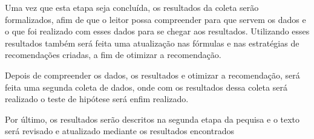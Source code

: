 Uma vez que esta etapa seja concluída, os resultados da coleta serão formalizados, afim de que o leitor
possa compreender para que servem os dados e o que foi realizado com esses
dados para se chegar aos resultados. Utilizando esses resultados também
será feita uma atualização nas fórmulas e nas estratégias de recomendações
criadas, a fim de otimizar a recomendação.

Depois de compreender os dados, os resultados e otimizar a recomendação,
será feita uma segunda coleta de dados, onde com os resultados dessa coleta
será realizado o teste de hipótese será enfim realizado.

Por último, os resultados serão descritos na segunda etapa da pequisa e o
texto será revisado e atualizado mediante os resultados encontrados

